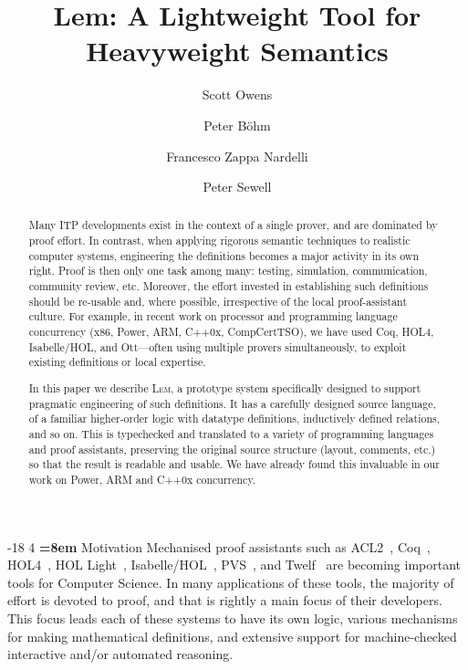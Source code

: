 \documentclass[a4paper]{llncs}
\author{Scott Owens\inst{1} \and Peter B\"ohm\inst{1} \and Francesco Zappa Nardelli\inst{2} \and Peter Sewell\inst{1}}
\title{Lem: A Lightweight Tool for Heavyweight Semantics}
\institute{University of Cambridge \and INRIA\\ \url{www.cl.cam.ac.uk/users/so294/lem}\vspace*{-3mm}}
\makeatletter
\renewcommand{\section}{\vspace*{-2mm}\@startsection{section}{1}{\z@}%
                       {-18\p@ \@plus -4\p@ \@minus -4\p@}%
                       {4\p@ \@plus 2\p@ \@minus 2\p@}%
                       {\normalfont\large\bfseries\boldmath
                        \rightskip=\z@ \@plus 8em\pretolerance=10000 }}
\newcommand{\toolname}{\textsc{Lem}}
\makeatother
\begin{document}
\sloppy
\maketitle
\vspace*{-3mm}
\begin{abstract}
Many ITP developments exist in the context of a single prover, and are
dominated by proof effort.  In contrast, when applying rigorous semantic
techniques to realistic computer systems, engineering the
definitions becomes a major activity in its own right.  Proof is then
only one task among many: testing, simulation, communication, community
review, etc.  Moreover, the effort invested in establishing such
definitions should be re-usable and, where possible, irrespective of the
local proof-assistant culture.  For example, in recent work on processor
and programming language concurrency (x86, Power, ARM, C++0x,
CompCertTSO), we have used Coq, HOL4, Isabelle/HOL, and Ott---often
using multiple provers simultaneously, to exploit existing definitions or
local expertise.   

In this paper we describe \toolname{}, a prototype system specifically designed to
support pragmatic engineering of such definitions.  It has a carefully
designed source language, of a familiar higher-order logic with datatype
definitions, inductively defined relations, and so on.  This is
typechecked and translated to a variety
of programming languages and proof assistants, preserving the
original source structure (layout,  comments, etc.) so that the result
is readable and usable.  We have already found this invaluable in our
work on Power, ARM and C++0x concurrency.
\end{abstract}

\vspace*{-7mm}

\section{Motivation}
Mechanised proof assistants %
such as ACL2~\cite{ACL2}, Coq~\cite{Coq}, HOL4~\cite{HOL}, HOL
Light~\cite{HOLlight}, Isabelle/HOL~\cite{Isabelle}, PVS~\cite{PVS}, and
Twelf~\cite{Twelf} are becoming important tools for Computer Science.
In many applications of these tools, the majority of effort is devoted
to proof, and that is rightly a main focus of their developers.  This
focus leads each of these systems to have its own logic, various mechanisms for
making mathematical definitions, and extensive support for machine-checked interactive and/or automated
reasoning.
\end{document}
